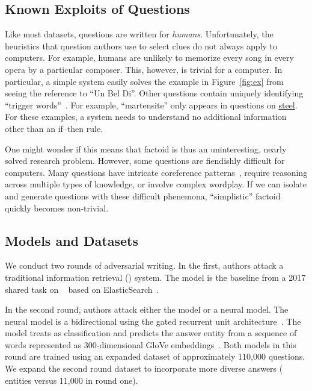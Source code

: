 \subsection{Known Exploits of \qb{} Questions}
\label{subsec:exploits}

Like most  datasets, \qb{} questions are
written for \emph{humans}. Unfortunately, the heuristics that
question authors use to select clues do not always apply to
computers. For example, humans are unlikely to memorize every song in
every opera by a particular composer. This, however, is trivial for a
computer. In particular, a simple  system easily
solves the example in Figure~\ref{fig:ex} from seeing the reference to
``Un Bel Di''. Other questions contain uniquely identifying ``trigger
words''~\cite{harris2006prisoner}. For example, ``martensite'' only appears in questions on
\underline{steel}. For these examples, a  system needs
to understand no additional information other than an if--then rule.

One might wonder if this means that factoid  is thus an
uninteresting, nearly solved research problem.  However, some \qb{}
questions are fiendishly difficult for computers. Many questions have
intricate coreference patterns~\cite{guha15coref}, require reasoning
across multiple types of knowledge, or involve complex wordplay. If we can
isolate and generate questions with these difficult phenemona,
``simplistic'' factoid  quickly becomes non-trivial.

\subsection{Models and Datasets}
\label{subsec:models}

We conduct two rounds of adversarial writing. In the first, authors
attack a traditional information retrieval () system.
The  model is the baseline from
a  2017 shared task on \qb{}~\cite{boydgraber2018nips} based on ElasticSearch~\cite{gormley2015elasticsearch}.

In the second round, authors attack either the  model or
a neural  model. The neural model is 
a bidirectional  using
the gated recurrent unit architecture~\cite{cho2014gru}.
The model treats \qb{} as classification and predicts the answer entity from a sequence of words
represented as 300-dimensional GloVe
embeddings~\cite{pennington2014glove}. Both models
in this round are trained using an expanded dataset of 
approximately 110,000 \qb{} questions. We expand the second round 
dataset to incorporate more diverse answers (\nansweroptions{} entities
versus 11,000 in round one).

